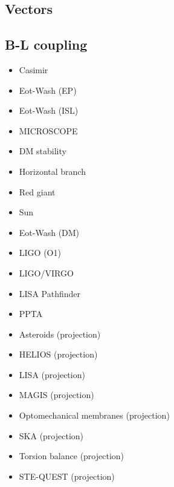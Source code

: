 \documentclass[8pt,twocolumn]{extarticle}
\begin{document}
\begin{mdframed}
\vspace{-1em}
\section{Vectors}\vspace{-0.5em}

\subsection*{B-L coupling}\vspace{-0.5em}
\begin{itemize}\setlength\itemsep{-0.5em}
	\item Casimir~\cite{Bordag:2001qi,Decca:2005qz,Sushkov:2011md}
	\item Eot-Wash (EP)~\cite{Wagner:2012ui}
	\item Eot-Wash (ISL)~\cite{Adelberger:2009zz}
	\item MICROSCOPE~\cite{MICROSCOPE:2022doy}
	\item DM stability~\cite{Chun:2022qcg}
	\item Horizontal branch~\cite{Li:2023vpv}
	\item Red giant~\cite{Li:2023vpv}
	\item Sun~\cite{Li:2023vpv}
	\item Eot-Wash (DM)~\cite{Shaw:2021gnp}
	\item LIGO (O1)~\cite{LIGOScientific:2021ffg}
	\item LIGO/VIRGO~\cite{LIGOScientific:2021ffg}
	\item LISA Pathfinder~\cite{Miller:2023kkd,Frerick:2023aaa}
	\item PPTA~\cite{PPTA:2021uzb}
	\item Asteroids (projection)~\cite{Fedderke:2022ptm}
	\item HELIOS (projection)~\cite{Hirschel:2023sbx}
	\item LISA (projection)~\cite{Fedderke:2022ptm}
	\item MAGIS (projection)~\cite{MAGIS}
	\item Optomechanical membranes (projection)~\cite{Manley:2020mjq}
	\item SKA (projection)~\cite{Graham:2015ifn}
	\item Torsion balance (projection)~\cite{Graham:2015ifn}
	\item STE-QUEST (projection)~\cite{Ahlers:2022jdt}
\end{itemize}
\end{mdframed}
\end{document}

